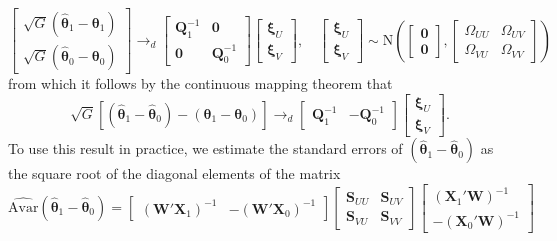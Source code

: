 \[
\begin{bmatrix}
\sqrt{G}(\widehat{\boldsymbol{\theta}}_1 - \boldsymbol{\theta}_1)\\
\sqrt{G}(\widehat{\boldsymbol{\theta}}_0 - \boldsymbol{\theta}_0)
\end{bmatrix} \rightarrow_d
\begin{bmatrix}
\mathbf{Q}_1^{-1} & \mathbf{0} \\
\mathbf{0} & \mathbf{Q}_0^{-1} 
\end{bmatrix}
\begin{bmatrix}
\boldsymbol{\xi}_U \\ \boldsymbol{\xi}_V 
\end{bmatrix}, \quad
\begin{bmatrix}
\boldsymbol{\xi}_U \\ \boldsymbol{\xi}_V 
\end{bmatrix} \sim \text{N}\left(\begin{bmatrix} \mathbf{0} \\ \mathbf{0}\end{bmatrix},
\begin{bmatrix}
\Omega_{UU} & \Omega_{UV} \\
\Omega_{VU} & \Omega_{VV}
\end{bmatrix}\right)
\]
from which it follows by the continuous mapping theorem that
\[
\sqrt{G}\left[ (\widehat{\boldsymbol{\theta}}_1 - \widehat{\boldsymbol{\theta}}_0 ) - (\boldsymbol{\theta}_1 - \boldsymbol{\theta}_0)\right] 
\rightarrow_d
\begin{bmatrix}
\mathbf{Q}_1^{-1} & -\mathbf{Q}_0^{-1}
\end{bmatrix}
\begin{bmatrix}
\boldsymbol{\xi}_U \\ \boldsymbol{\xi}_V 
\end{bmatrix}.
\]
To use this result in practice, we estimate the standard errors of  $(\widehat{\boldsymbol{\theta}}_1 - \widehat{\boldsymbol{\theta}}_0)$ as the square root of the diagonal elements of the matrix
\[
\widehat{\text{Avar}}(\widehat{\boldsymbol{\theta}}_1 - \widehat{\boldsymbol{\theta}}_0) 
= \begin{bmatrix}
\left(\mathbf{W}'\mathbf{X}_1\right)^{-1} &
-\left(\mathbf{W}'\mathbf{X}_0\right)^{-1} 
\end{bmatrix}
\begin{bmatrix}
\mathbf{S}_{UU}& \mathbf{S}_{UV}\\
\mathbf{S}_{VU}& \mathbf{S}_{VV}
\end{bmatrix} 
\begin{bmatrix}
\left(\mathbf{X}_1'\mathbf{W}\right)^{-1} \\
-\left(\mathbf{X}_0'\mathbf{W}\right)^{-1} 
\end{bmatrix}
\]
